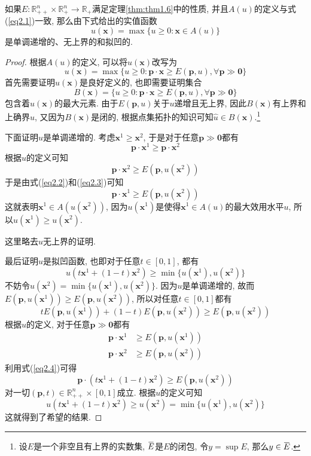 \documentclass[cn, 12pt, math=mtpro2, bibstyle=apa, blue]{elegantbook}
\newcommand{\R}{\mathbb{R}}
\newcommand{\p}{\mathbf{p}}
\newcommand{\x}{\mathbf{x}}
\newcommand{\overbar}[1]{\mkern 1.5mu\overline{\mkern-1.5mu#1\mkern-1.5mu}\mkern 1.5mu}
\begin{document}
\begin{theorem}\label{thm:thm2.1}
  如果$E:\R_{++}^n\times\R_+^n\to\R_+$满足定理\ref{thm:thm1.6}中的性质, 并且$A(u)$的定义与式(\ref{eq2.1})一致, 那么由下式给出的实值函数
  \begin{equation}\label{eq2.5}
    u(\x)=\max\{u\ge0: \x\in A(u)\}
  \end{equation}
  是单调递增的、无上界的和拟凹的.
\end{theorem}
\begin{proof}
  根据$A(u)$的定义, 可以将$u(\x)$改写为
  \begin{equation}\label{eq2.9}
    u(\x)=\max\{u\ge0: \p\cdot\x\geq E(\p,u),\forall \p\gg\mathbf{0}\}
  \end{equation}
  首先需要证明$u(\x)$是良好定义的, 也即需要证明集合
  $$B(\x)=\{u\ge0: \p\cdot\x\geq E(\p,u),\forall \p\gg\mathbf{0}\}$$
  包含着$u(\x)$的最大元素. 由于$E(\p,u)$关于$u$递增且无上界, 因此$B(\x)$有上界和上确界$\hat{u}$, 又因为$B(\x)$是闭的, 根据点集拓扑的知识可知$\hat{u}\in B(\x)$.\footnote{设$E$是一个非空且有上界的实数集, $\overbar{E}$是$E$的闭包, 令$y=\sup E$, 那么$y\in\overbar{E}$.}

  下面证明$u$是单调递增的. 考虑$\x^1\ge\x^2$, 于是对于任意$\p\gg\mathbf{0}$都有
  \begin{equation}\label{eq2.2}
    \p\cdot\x^1\ge\p\cdot\x^2
  \end{equation}
  根据$u$的定义可知
  \begin{equation}\label{eq2.3}
    \p\cdot\x^2\geq E(\p,u(\x^2))
  \end{equation}
  于是由式(\ref{eq2.2})和(\ref{eq2.3})可知
  $$\p\cdot\x^1\geq E(\p,u(\x^2))$$
  这就表明$\x^1\in A(u(\x^2))$, 因为$u(\x^1)$是使得$\x^1\in A(u)$的最大效用水平$u$, 所以$u(\x^1)\ge u(\x^2)$.

  这里略去$u$无上界的证明.

  最后证明$u$是拟凹函数, 也即对于任意$t\in[0,1]$, 都有
  $$u(t\x^1+(1-t)\x^2)\geq \min\{u(\x^1), u(\x^2)\}$$
  不妨令$u(\x^2)=\min\{u(\x^1), u(\x^2)\}$. 因为$u$是单调递增的, 故而$E(\p,u(\x^1))\geq E(\p,u(\x^2))$, 所以对任意$t\in[0,1]$都有
  \begin{equation}\label{eq2.4}
    tE(\p,u(\x^1))+(1-t)E(\p,u(\x^2))\geq E(\p,u(\x^2))
  \end{equation}
  根据$u$的定义, 对于任意$\p\gg\mathbf{0}$都有
  \begin{align*}
  \p\cdot\x^1&\geq E(\p,u(\x^1)) \\
  \p\cdot\x^2&\geq E(\p,u(\x^2))
  \end{align*}
  利用式(\ref{eq2.4})可得
  $$\p\cdot(t\x^1+(1-t)\x^2)\geq E(\p,u(\x^2))$$
  对一切$(\p,t)\in\R_{++}^n\times [0,1]$成立. 根据$u$的定义可知
  $$u(t\x^1+(1-t)\x^2)\geq u(\x^2)=\min\{u(\x^1),u(\x^2)\}$$
  这就得到了希望的结果.
\end{proof}
\end{document}
